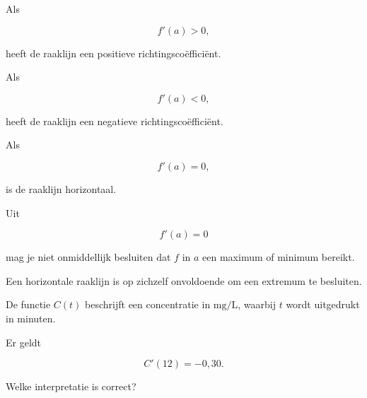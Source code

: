 \documentclass{ximera}
\begin{document}

Als

\[
f'(a)>0,
\]

heeft de raaklijn een positieve richtingscoëfficiënt.

Als

\[
f'(a)<0,
\]

heeft de raaklijn een negatieve richtingscoëfficiënt.

Als

\[
f'(a)=0,
\]

is de raaklijn horizontaal.

\begin{opmerking}
Uit

\[
f'(a)=0
\]

mag je niet onmiddellijk besluiten dat $f$ in $a$
een maximum of minimum bereikt.

Een horizontale raaklijn is op zichzelf onvoldoende om een
extremum te besluiten.
\end{opmerking}




\begin{oefening}{\oefB \ESS}

De functie $C(t)$ beschrijft een concentratie in $\mathrm{mg/L}$,
waarbij $t$ wordt uitgedrukt in minuten.

Er geldt

\[
C'(12)=-0,30.
\]

Welke interpretatie is correct?

\begin{multipleChoice}





\end{multipleChoice}

\end{oefening}


\end{document}
